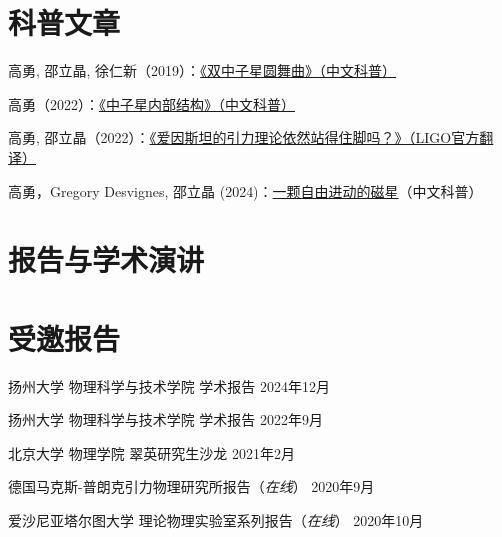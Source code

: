 \documentclass[margin,line]{res_mod}
\begin{document}
\begin{resume}
\section{科普文章}
\begin{etaremune}
\item 高勇, 邵立晶, 徐仁新（2019）：\href{https://gravyong.github.io/files/BNS_Popular.pdf}{《双中子星圆舞曲》（中文科普）}
\item 高勇（2022）：\href{https://gravyong.github.io/files/NS_Structure_Popular.pdf}{《中子星内部结构》（中文科普）}
\item 高勇, 邵立晶（2022）：\href{https://www.ligo.org/science/Publication-O3bTGR/translations/science-summary-chinese-simplified.pdf}{《爱因斯坦的引力理论依然站得住脚吗？》（LIGO官方翻译）}
\item 高勇，Gregory Desvignes, 邵立晶 (2024)：\href{https://pure.mpg.de/rest/items/item_3612895_2/component/file_3612896/content}{一颗自由进动的磁星}（中文科普）
\end{etaremune}

\section{报告与学术演讲}
\vspace*{.4in}
\newcommand{\playsymbol}{$\blacktriangleright$}
\section{\sc 受邀报告}
\begin{etaremune}
  \item 扬州大学 物理科学与技术学院 学术报告 \hfill{} 2024年12月
  \item 扬州大学 物理科学与技术学院 学术报告 \hfill{} 2022年9月
  \item 北京大学 物理学院 翠英研究生沙龙 \hfill{} 2021年2月
  \item 德国马克斯-普朗克引力物理研究所报告（{\it 在线}） \hfill{} 2020年9月
  \item 爱沙尼亚塔尔图大学 理论物理实验室系列报告（{\it 在线}） \hfill{} 2020年10月
\end{etaremune}


\end{resume}
\end{document}
